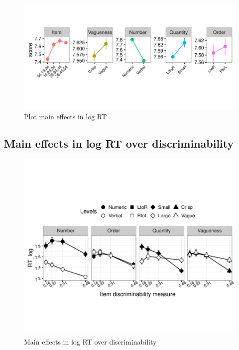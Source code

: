 \documentclass[a4paper,12pt,twoside]{article}\usepackage[]{graphicx}\usepackage[]{color}
\makeatletter
\def\maxwidth{ %
  \ifdim\Gin@nat@width>\linewidth
    \linewidth
  \else
    \Gin@nat@width
  \fi
}
\newenvironment{knitrout}{}{} %
\makeatother
\begin{document}
\begin{knitrout}\scriptsize
{}\color{fgcolor}\begin{figure}[htbp]

{\centering \includegraphics[width=\maxwidth]{figure/graphics-plotMainEffectsLog-1} 

}

\caption[Plot main effects in log RT]{Plot main effects in log RT}\label{fig:plotMainEffectsLog}
\end{figure}


\end{knitrout}
  
\clearpage
\subsection{Main effects in log RT over discriminability}


\begin{knitrout}\scriptsize
{}\color{fgcolor}\begin{figure}[hbtp]

{\centering \includegraphics[width=\maxwidth]{figure/graphics-mainD-1} 

}

\caption[Main effects in log RT over discriminability]{Main effects in log RT over discriminability}\label{fig:mainD}
\end{figure}


\end{knitrout}
\end{document}
